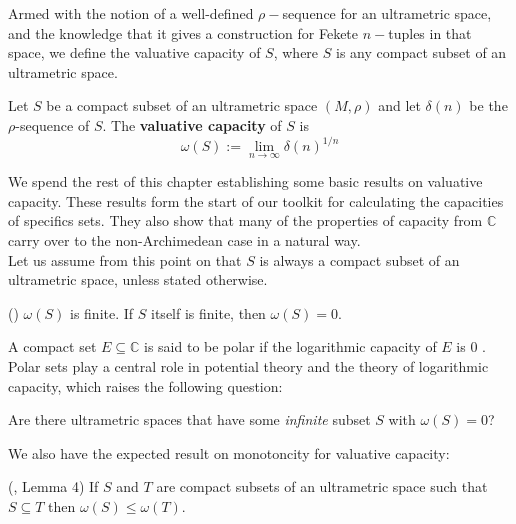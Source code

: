 Armed with the notion of a well-defined $\rho-$sequence for an ultrametric space, and the knowledge that it gives a construction for Fekete $n-$tuples in that space, we define the valuative capacity of $S$, where $S$ is any compact subset of an ultrametric space.\\

\begin{definition}
	\cite{kj}  Let $S$ be a compact subset of an ultrametric space $(M,\rho)$ and let $\delta(n)$ be the $\rho$-sequence of $S$. The \textbf{valuative capacity} of $S$ is \[\omega(S)
	:= \lim_{n\to\infty} \delta(n)^{1/n}\]  
\end{definition}

We spend the rest of this chapter establishing some basic results on valuative capacity. These results form the start of our toolkit for calculating the capacities of specifics sets. They also show that many of the properties of capacity from $\mathbb{C}$ carry over to the non-Archimedean case in a natural way. \\

Let us assume from this point on that $S$ is always a compact subset of an ultrametric space, unless stated otherwise.\\ 

\begin{proposition}
	(\cite{kj}) $\omega(S)$ is finite. If $S$ itself is finite, then $\omega(S) =0$.
\end{proposition}

A compact set $E \subseteq \mathbb{C}$ is said to be polar if the logarithmic capacity of $E$ is $0$ \cite{rand}. Polar sets play a central role in potential theory and the theory of logarithmic capacity, which raises the following question:\\

\begin{question}
Are there ultrametric spaces that have some \textit{infinite} subset $S$ with $\omega(S)=0$?
\end{question}

We also have the expected result on monotoncity for valuative capacity:\\

\begin{proposition}
	(\cite{kj}, Lemma 4) If $S$ and $T$ are compact subsets of an ultrametric space such that $S \subseteq T$ then $\omega(S) \leq \omega(T)$. 
\end{proposition}


